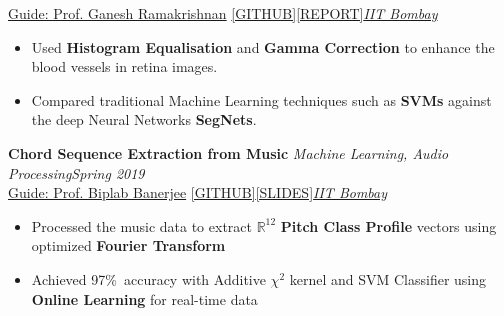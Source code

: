 \documentclass[10pt]{article}
\def\projectSpace{\vspace{-5pt}}
\begin{document}
 \href{https://www.cse.iitb.ac.in/~ganesh/}{Guide: Prof. Ganesh Ramakrishnan}\hspace{10pt} \href{https://github.com/yashkhem1/STARE}{[GITHUB]}\hspace{3pt}\href{https://drive.google.com/file/d/103Tv4cvvRDuT_cwAA2I3vb0ap6J8kVLY/view?usp=sharing}{[REPORT]}\hfill{\sl \small \href{http://www.iitb.ac.in/}{IIT Bombay}}\\\vspace{-15pt}
\begin{itemize}[itemsep = -0.75 mm, leftmargin=*]
    \item Used \textbf{Histogram Equalisation} and \textbf{Gamma Correction} to enhance the blood vessels in retina images.
    \item Compared traditional Machine Learning techniques such as \textbf{SVMs} against the deep Neural Networks \textbf{SegNets}.
\end{itemize}
\newpage
\hspace{-18pt}
\textbf{\large Chord Sequence Extraction from Music} \textemdash \textit{Machine Learning, Audio Processing}\hfill{\sl \small Spring 2019}\\
  \href{http://bbanerjee.netlify.com/} {Guide: Prof. Biplab Banerjee}\hspace{10pt} \href{https://github.com/yashkhem1/Chord-Extraction-using-Machine-Learning}{[GITHUB]}\hspace{3pt}\href{https://docs.google.com/presentation/d/10km5SI1Jw4K8bnWFVvcwYwq3_Bkq11ViB2R3TdQuKAg/edit?usp=sharing}{[SLIDES]}\hfill{\sl \small \href{http://www.iitb.ac.in/}{IIT Bombay}}\\\vspace{-15pt}
\begin{itemize}[itemsep = -0.75 mm, leftmargin=*]
    \item Processed the music data to extract $ \mathbb{R}^{12} $ {\bf Pitch Class Profile} vectors using optimized {\bf Fourier Transform}
    \item Achieved  97\%\ accuracy with Additive $ \chi^{2} $ kernel and SVM Classifier using {\bf Online Learning} for real-time data
\end{itemize}
\vspace*{8pt}

\projectSpace
\end{document}
